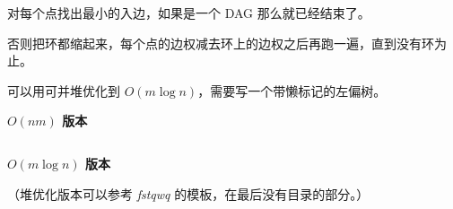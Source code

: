 对每个点找出最小的入边，如果是一个 DAG 那么就已经结束了。

否则把环都缩起来，每个点的边权减去环上的边权之后再跑一遍，直到没有环为止。

可以用可并堆优化到 $O(m\log n)$，需要写一个带懒标记的左偏树。

{\large\textbf{$O(nm)$ 版本}}

\inputminted{cpp}{../src/graph/最小树形图.cpp}

{\large\textbf{$O(m\log n)$ 版本}}

（堆优化版本可以参考 \textit{fstqwq} 的模板，在最后没有目录的部分。）
